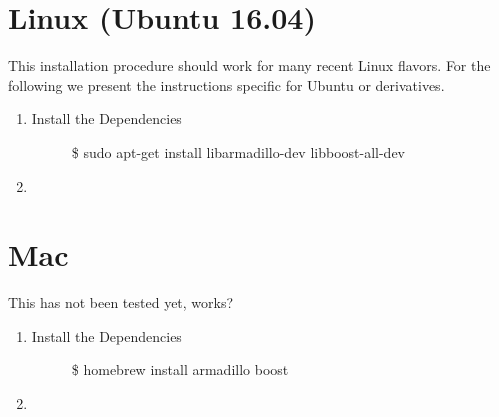 \documentclass[letterpaper,10pt,english]{sphinxmanual}
\begin{document}
\section{Linux (Ubuntu 16.04)}
\label{\detokenize{installation:linux-ubuntu-16-04}}
This installation procedure should work for many recent Linux flavors. For the following
we present the instructions specific for Ubuntu or derivatives.
\begin{enumerate}
\item {} \begin{description}
\item[{Install the Dependencies}] \leavevmode
\$ sudo apt-get install libarmadillo-dev libboost-all-dev

\end{description}

\item {} 

\end{enumerate}


\section{Mac}
\label{\detokenize{installation:mac}}
This has not been tested yet, works?
\begin{enumerate}
\item {} \begin{description}
\item[{Install the Dependencies}] \leavevmode
\$ homebrew install armadillo boost

\end{description}

\item {} 

\end{enumerate}
\end{document}
